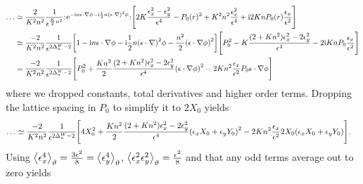 \documentclass[english, parskip=full]{scrartcl}
\begin{document}
\begin{align}
\dots &\simeq \frac{2}{K^2n^2} \frac{1}{\epsilon^{\frac{K}{2}n^2}} \normord{\powe{- \i n\epsilon\cdot \nabla \phi - \i \frac{1}{2} n\kla*{\epsilon\cdot\nabla }^2\phi}} \klb*{2K \frac{\epsilon_x^2-\epsilon_y^2}{\epsilon^4} - P_0(r)^2 + K^2n^2 \frac{\epsilon_x^2}{\epsilon^4} + \i 2Kn P_0(r) \frac{\epsilon_x}{\epsilon^2} }\\
&\simeq \frac{-2}{K^2n^2} \frac{1}{\epsilon^{2\Delta^W_n - 2}} \klb*{1 - \i n\epsilon\cdot \nabla \phi - \i \frac{1}{2} n\kla*{\epsilon\cdot\nabla }^2\phi - \frac{n^2}{2} \kla*{\epsilon\cdot \nabla\phi}^2} \klb*{P_0^2 - K \frac{(2 + Kn^2)\epsilon_x^2-2\epsilon_y^2}{\epsilon^4} - 2\i Kn P_0 \frac{\epsilon_x}{\epsilon^2}}\\
&= \frac{-2}{K^2n^2} \frac{1}{\epsilon^{2\Delta^W_n - 2}} \klb*{P_0^2 + \frac{Kn^2}{2} \frac{(2+Kn^2)\epsilon_x^2 - 2\epsilon_y^2}{\epsilon^4} \kla*{\epsilon\cdot\nabla\phi}^2 - 2Kn^2 \frac{\epsilon_x}{\epsilon^2} P_0 \epsilon\cdot \nabla\phi}
\end{align}
where we dropped constants, total derivatives and higher order terms.
Dropping the lattice spacing in $P_0$ to simplify it to $2X_0$ yields
\begin{align}
\dots &\simeq \frac{-2}{K^2n^2} \frac{1}{\epsilon^{2\Delta^W_n - 2}} \klb*{4 X_0^2 + \frac{Kn^2}{2} \frac{(2+Kn^2)\epsilon_x^2 - 2\epsilon_y^2}{\epsilon^4} \kla*{\epsilon_x X_0 + \epsilon_y Y_0}^2 - 2Kn^2 \frac{\epsilon_x}{\epsilon^2} 2X_0 \kla*{\epsilon_x X_0 + \epsilon_y Y_0}}.
\end{align}
Using $\bra*{\epsilon_x^4}_\vartheta = \frac{3\epsilon^2}{8} = \bra*{\epsilon_y^4}_\vartheta$, $\bra*{\epsilon_x^2\epsilon_y^2}_\vartheta = \frac{\epsilon^2}{8}$ and that any odd terms average out to zero yields
\end{document}
